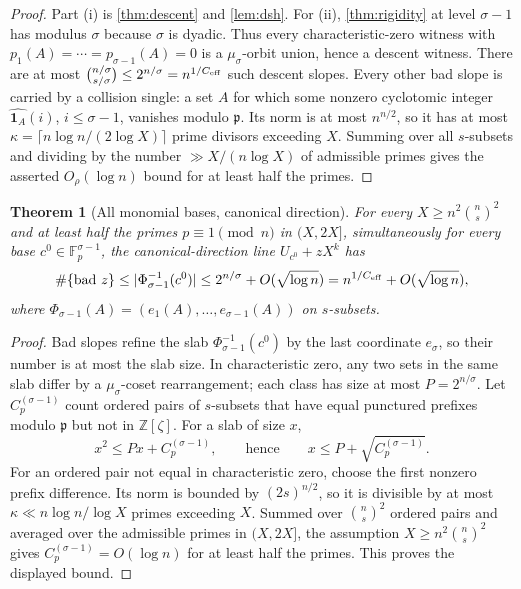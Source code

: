 \documentclass[11pt]{article}
\newtheorem{theorem}{Theorem}[section]
\theoremstyle{definition}
\newcommand{\F}{\mathbb F}
\newcommand{\Z}{\mathbb Z}
\newcommand{\ceff}{C_{\rm eff}}
\begin{document}
\begin{proof}
Part (i) is \cref{thm:descent} and \cref{lem:dsh}.  For (ii), \cref{thm:rigidity} at level $\sigma-1$ has modulus $\sigma$ because $\sigma$ is dyadic.  Thus every characteristic-zero witness with $p_1(A)=\cdots=p_{\sigma-1}(A)=0$ is a $\mu_\sigma$-orbit union, hence a descent witness.  There are at most $\binom{n/\sigma}{s/\sigma}\le2^{n/\sigma}=n^{1/\ceff}$ such descent slopes.  Every other bad slope is carried by a collision single: a set $A$ for which some nonzero cyclotomic integer $\widehat{\mathbf 1_A}(i)$, $i\le\sigma-1$, vanishes modulo $\mathfrak p$.  Its norm is at most $n^{n/2}$, so it has at most $\kappa=\lceil n\log n/(2\log X)\rceil$ prime divisors exceeding $X$.  Summing over all $s$-subsets and dividing by the number $\gg X/(n\log X)$ of admissible primes gives the asserted $O_\rho(\log n)$ bound for at least half the primes.
\end{proof}

\begin{theorem}[All monomial bases, canonical direction]\label{thm:allbases}
For every $X\ge n^2\binom ns^2$ and at least half the primes $p\equiv1\pmod n$ in $(X,2X]$, simultaneously for every base $c^0\in\F_p^{\sigma-1}$, the canonical-direction line $U_{c^0}+zX^k$ has
\[
        \#\{\text{bad }z\}
        \le |\Phi_{\sigma-1}^{-1}(c^0)|
        \le 2^{n/\sigma}+O(\sqrt{\log n})
        =n^{1/\ceff}+O(\sqrt{\log n}),
\]
where $\Phi_{\sigma-1}(A)=(e_1(A),\dots,e_{\sigma-1}(A))$ on $s$-subsets.
\end{theorem}

\begin{proof}
Bad slopes refine the slab $\Phi_{\sigma-1}^{-1}(c^0)$ by the last coordinate $e_\sigma$, so their number is at most the slab size.  In characteristic zero, any two sets in the same slab differ by a $\mu_\sigma$-coset rearrangement; each class has size at most $P=2^{n/\sigma}$.  Let $C_p^{(\sigma-1)}$ count ordered pairs of $s$-subsets that have equal punctured prefixes modulo $\mathfrak p$ but not in $\Z[\zeta]$.  For a slab of size $x$,
\[
        x^2\le Px+C_p^{(\sigma-1)},
        \qquad\text{hence}\qquad
        x\le P+\sqrt{C_p^{(\sigma-1)}}.
\]
For an ordered pair not equal in characteristic zero, choose the first nonzero prefix difference.  Its norm is bounded by $(2s)^{n/2}$, so it is divisible by at most $\kappa\ll n\log n/\log X$ primes exceeding $X$.  Summed over $\binom ns^2$ ordered pairs and averaged over the admissible primes in $(X,2X]$, the assumption $X\ge n^2\binom ns^2$ gives $C_p^{(\sigma-1)}=O(\log n)$ for at least half the primes.  This proves the displayed bound.
\end{proof}
\end{document}
